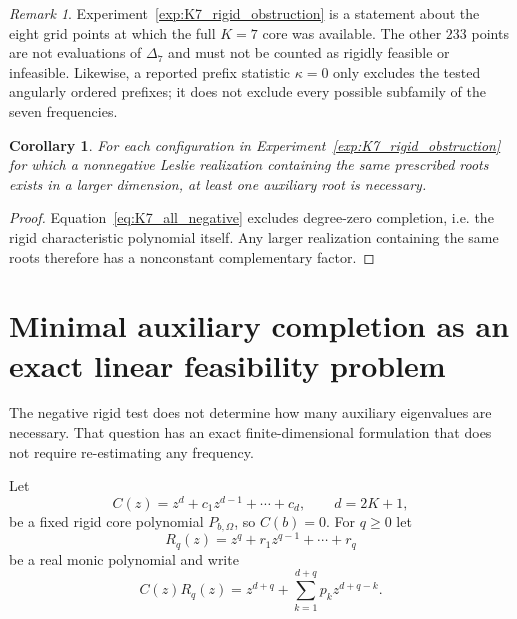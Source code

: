 \documentclass[11pt]{amsart}
\numberwithin{equation}{section}
\theoremstyle{plain}
\newtheorem{corollary}[theorem]{Corollary}
\theoremstyle{definition}
\theoremstyle{remark}
\newtheorem{remark}[theorem]{Remark}
\begin{document}
\begin{remark}
\label{rem:K7_scope}
Experiment~\ref{exp:K7_rigid_obstruction} is a statement about the eight grid points at which the full $K=7$ core was available.  The other $233$ points are not evaluations of $\Delta_7$ and must not be counted as rigidly feasible or infeasible.  Likewise, a reported prefix statistic $\kappa=0$ only excludes the tested angularly ordered prefixes; it does not exclude every possible subfamily of the seven frequencies.
\end{remark}

\begin{corollary}
\label{cor:auxiliary_necessary}
For each configuration in Experiment~\ref{exp:K7_rigid_obstruction} for which a nonnegative Leslie realization containing the same prescribed roots exists in a larger dimension, at least one auxiliary root is necessary.
\end{corollary}

\begin{proof}
Equation~\eqref{eq:K7_all_negative} excludes degree-zero completion, i.e. the rigid characteristic polynomial itself.  Any larger realization containing the same roots therefore has a nonconstant complementary factor.
\end{proof}

\section{Minimal auxiliary completion as an exact linear feasibility problem}
\label{sec:minimal_auxiliary_completion}

The negative rigid test does not determine how many auxiliary eigenvalues are necessary.  That question has an exact finite-dimensional formulation that does not require re-estimating any frequency.

Let
\begin{equation}
C(z)=z^d+c_1z^{d-1}+\cdots+c_d,
\qquad d=2K+1,
\label{eq:core_polynomial_C}
\end{equation}
be a fixed rigid core polynomial $P_{b,\Omega}$, so $C(b)=0$.  For $q\geq0$ let
\begin{equation}
R_q(z)=z^q+r_1z^{q-1}+\cdots+r_q
\label{eq:auxiliary_multiplier}
\end{equation}
be a real monic polynomial and write
\begin{equation}
C(z)R_q(z)
=
z^{d+q}+\sum_{k=1}^{d+q}p_k z^{d+q-k}.
\label{eq:completed_product_coefficients}
\end{equation}
\end{document}
